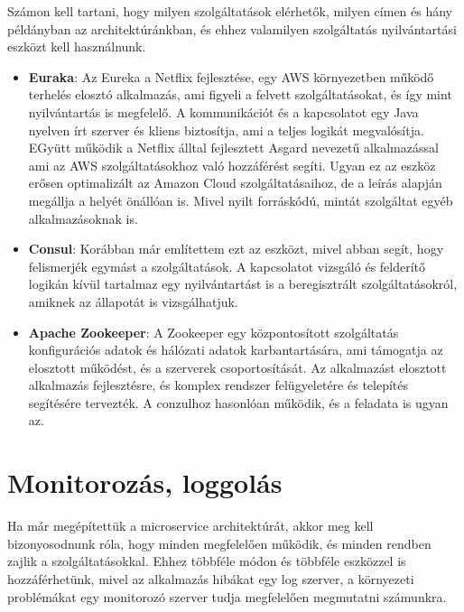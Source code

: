 \documentclass[11pt,magyar,a4paper,oneside,]{report}
\begin{document}
Számon kell tartani, hogy milyen szolgáltatások elérhetők, milyen címen
és hány példányban az architektúránkban, és ehhez valamilyen
szolgáltatás nyilvántartási eszközt kell használnunk.

\begin{itemize}
\item
  \textbf{Euraka}: Az Eureka a Netflix fejlesztése, egy AWS környezetben
  működő terhelés elosztó alkalmazás, ami figyeli a felvett
  szolgáltatásokat, és így mint nyilvántartás is megfelelő. A
  kommunikációt és a kapcsolatot egy Java nyelven írt szerver és kliens
  biztosítja, ami a teljes logikát megvalósítja. EGyütt működik a
  Netflix álltal fejlesztett Asgard nevezetű alkalmazással ami az AWS
  szolgáltatásokhoz való hozzáférést segíti. Ugyan ez az eszköz erősen
  optimalizált az Amazon Cloud szolgáltatásaihoz, de a leírás alapján
  megállja a helyét önállóan is. Mivel nyilt forráskódú, mintát
  szolgáltat egyéb alkalmazásoknak is.
\item
  \textbf{Consul}: Korábban már említettem ezt az eszközt, mivel abban
  segít, hogy felismerjék egymást a szolgáltatások. A kapcsolatot
  vizsgáló és felderítő logikán kívül tartalmaz egy nyilvántartást is a
  beregisztrált szolgáltatásokról, amiknek az állapotát is
  vizsgálhatjuk.
\item
  \textbf{Apache Zookeeper}: A Zookeeper egy központosított szolgáltatás
  konfigurációs adatok és hálózati adatok karbantartására, ami támogatja
  az elosztott működést, és a szerverek csoportosítását. Az alkalmazást
  elosztott alkalmazás fejlesztésre, és komplex rendszer felügyeletére
  és telepítés segítésére tervezték. A conzulhoz hasonlóan működik, és a
  feladata is ugyan az.
\end{itemize}

\section{Monitorozás, loggolás}\label{monitorozuxe1s-loggoluxe1s}

Ha már megépítettük a microservice architektúrát, akkor meg kell
bizonyosodnunk róla, hogy minden megfelelően működik, és minden rendben
zajlik a szolgáltatásokkal. Ehhez többféle módon és többféle eszközzel
is hozzáférhetünk, mivel az alkalmazás hibákat egy log szerver, a
környezeti problémákat egy monitorozó szerver tudja megfelelően
megmutatni számunkra.
\end{document}
